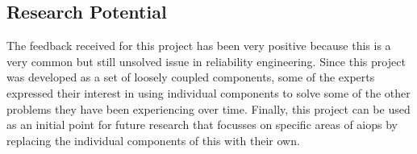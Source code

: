 \subsection{Research Potential}

The feedback received for this project has been very positive because this is a very common but still unsolved issue in reliability engineering. Since this project was developed as a set of loosely coupled components, some of the experts expressed their interest in using individual components to solve some of the other problems they have been experiencing over time. Finally, this project can be used as an initial point for future research that focusses on specific areas of \ac{aiops} by replacing the individual components of this with their own.